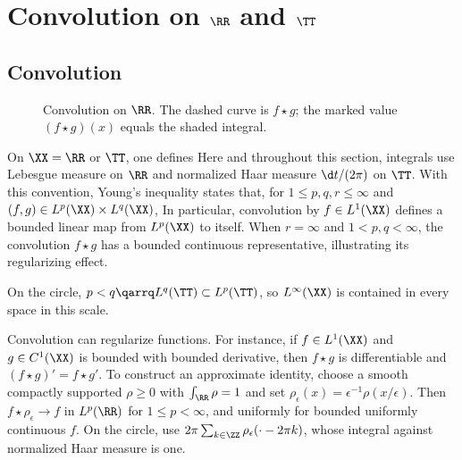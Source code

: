\section{Convolution on \texorpdfstring{$\RR$ and $\TT$}{the Line and the Circle}}

                                                
\subsection{Convolution}

\begin{figure}[tbp]
\centering
{}
\caption{Convolution on $\RR$. The dashed curve is $f\star g$; the marked value $(f\star g)(x)$ equals the shaded integral.}
\label{fig-review-fourier-convolution}
\end{figure}
On $\XX=\RR$ or $\TT$, one defines 
Here and throughout this section, integrals use Lebesgue measure on $\RR$ and normalized Haar measure $\d t/(2\pi)$ on $\TT$. With this convention, Young's inequality states that, for $1\leq p,q,r\leq\infty$ and $(f,g)\in L^p(\XX)\times L^q(\XX)$,
In particular, convolution by $f\in L^1(\XX)$ defines a bounded linear map from $L^p(\XX)$ to itself. When $r=\infty$ and $1<p,q<\infty$, the convolution $f\star g$ has a bounded continuous representative, illustrating its regularizing effect.
 
On the circle, $p<q \qarrq L^q(\TT) \subset L^p(\TT)$, so $L^\infty(\XX)$ is contained in every space in this scale.



Convolution can regularize functions. For instance, if $f \in L^1(\XX)$ and $g\in C^1(\XX)$ is bounded with bounded derivative, then $f \star g$ is differentiable and $(f \star g)'=f \star g'$. To construct an approximate identity, choose a smooth compactly supported $\rho\geq0$ with $\int_\RR\rho=1$ and set $\rho_\epsilon(x)=\epsilon^{-1}\rho(x/\epsilon)$. Then $f\star\rho_\epsilon\to f$ in $L^p(\RR)$ for $1\leq p<\infty$, and uniformly for bounded uniformly continuous $f$. On the circle, use $2\pi\sum_{k\in\ZZ}\rho_\epsilon(\cdot-2\pi k)$, whose integral against normalized Haar measure is one.
 
